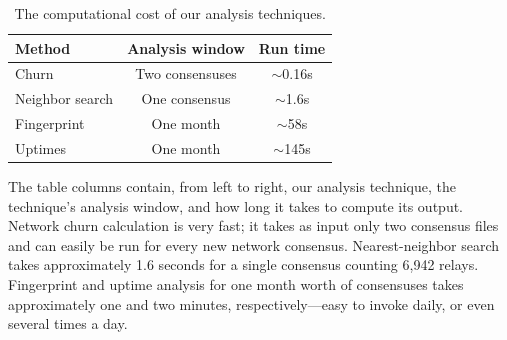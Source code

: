 \begin{table}[t]
	\centering
	\begin{tabular}{lcc}
	\hline
	\textbf{Method} & \textbf{Analysis window} & \textbf{Run time} \\
	\hline
	Churn & Two consensuses & $\sim$0.16s \\
	Neighbor search & One consensus & $\sim$1.6s \\
	Fingerprint & One month & $\sim$58s \\
	Uptimes & One month & $\sim$145s \\
	\hline
	\end{tabular}
	\caption{The computational cost of our analysis techniques.}
	\label{tab:exp-deployment}
\end{table}

The table columns contain, from left to right, our analysis technique, the
technique's analysis window, and how long it takes to compute its output.
Network churn calculation is very fast; it takes as input only two consensus
files and can easily be run for every new network consensus.  Nearest-neighbor
search takes approximately 1.6 seconds for a single consensus counting 6,942
relays.  Fingerprint and uptime analysis for one month worth of consensuses
takes approximately one and two minutes, respectively---easy to invoke daily, or
even several times a day.
